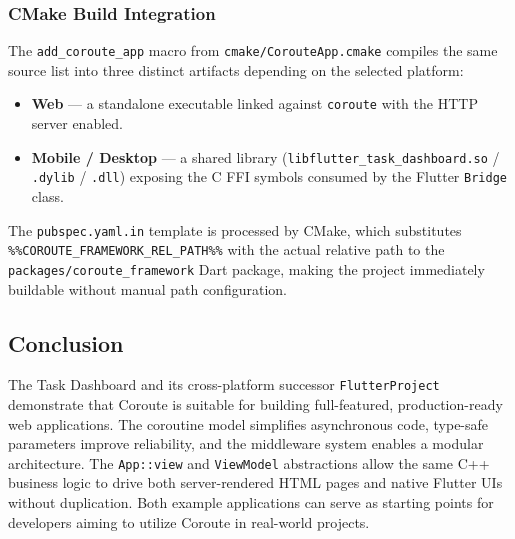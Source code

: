 \subsubsection{CMake Build Integration}

The \texttt{add\_coroute\_app} macro from \texttt{cmake/CorouteApp.cmake} compiles the same source list into three distinct artifacts depending on the selected platform:
\begin{itemize}
    \item \textbf{Web} --- a standalone executable linked against \texttt{coroute} with the HTTP server enabled.
    \item \textbf{Mobile / Desktop} --- a shared library (\texttt{libflutter\_task\_dashboard.so} / \texttt{.dylib} / \texttt{.dll}) exposing the C FFI symbols consumed by the Flutter \texttt{Bridge} class.
\end{itemize}

The \texttt{pubspec.yaml.in} template is processed by CMake, which substitutes \texttt{\%\%COROUTE\_FRAMEWORK\_REL\_PATH\%\%} with the actual relative path to the \texttt{packages/coroute\_framework} Dart package, making the project immediately buildable without manual path configuration.

\subsection{Conclusion}

The Task Dashboard and its cross-platform successor \texttt{FlutterProject} demonstrate that Coroute is suitable for building full-featured, production-ready web applications. The coroutine model simplifies asynchronous code, type-safe parameters improve reliability, and the middleware system enables a modular architecture. The \texttt{App::view} and \texttt{ViewModel} abstractions allow the same C++ business logic to drive both server-rendered HTML pages and native Flutter UIs without duplication. Both example applications can serve as starting points for developers aiming to utilize Coroute in real-world projects.
